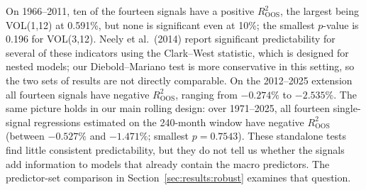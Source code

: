 \documentclass[11pt,a4paper]{article}
\begin{document}
On 1966--2011, ten of the fourteen signals have a positive
$R^2_{\mathrm{OOS}}$, the largest being VOL(1,12) at 0.591\%, but none is
significant even at 10\%; the smallest $p$-value is 0.196 for VOL(3,12).
Neely et al.\ (2014) report significant predictability for several of these
indicators using the Clark--West statistic, which is designed for nested
models; our Diebold--Mariano test is more conservative in this setting, so
the two sets of results are not directly comparable. On the 2012--2025
extension all fourteen signals have negative $R^2_{\mathrm{OOS}}$, ranging
from $-0.274\%$ to $-2.535\%$. The same picture holds in our main rolling
design: over 1971--2025, all fourteen single-signal regressions estimated on
the 240-month window have negative $R^2_{\mathrm{OOS}}$ (between $-0.527\%$
and $-1.471\%$; smallest $p=0.7543$). These standalone tests find little
consistent predictability, but they do not tell us whether the signals add
information to models that already contain the macro predictors. The
predictor-set comparison in Section~\ref{sec:results:robust} examines that question.
\end{document}
